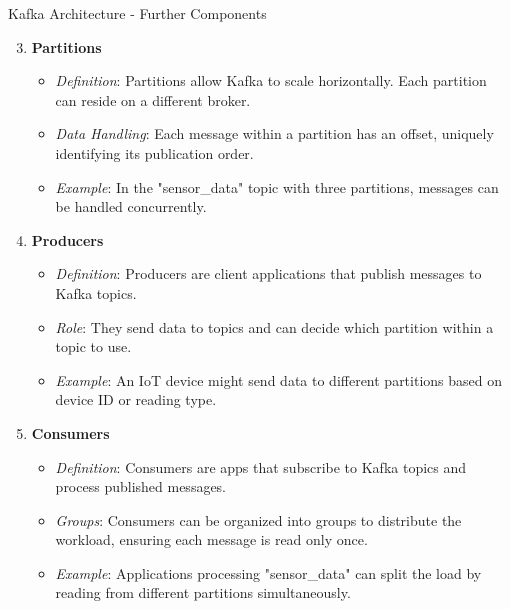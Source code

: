 \documentclass[aspectratio=169]{beamer}
\begin{document}
\begin{frame}[fragile]{Kafka Architecture - Further Components}
    \begin{enumerate}
        \setcounter{enumi}{2} %
        \item \textbf{Partitions}
        \begin{itemize}
            \item \textit{Definition}: Partitions allow Kafka to scale horizontally. Each partition can reside on a different broker.
            \item \textit{Data Handling}: Each message within a partition has an offset, uniquely identifying its publication order.
            \item \textit{Example}: In the "sensor_data" topic with three partitions, messages can be handled concurrently.

        \end{itemize}

        \item \textbf{Producers}
        \begin{itemize}
            \item \textit{Definition}: Producers are client applications that publish messages to Kafka topics.
            \item \textit{Role}: They send data to topics and can decide which partition within a topic to use.
            \item \textit{Example}: An IoT device might send data to different partitions based on device ID or reading type.
        \end{itemize}
        
        \item \textbf{Consumers}
        \begin{itemize}
            \item \textit{Definition}: Consumers are apps that subscribe to Kafka topics and process published messages.
            \item \textit{Groups}: Consumers can be organized into groups to distribute the workload, ensuring each message is read only once.
            \item \textit{Example}: Applications processing "sensor_data" can split the load by reading from different partitions simultaneously.
        \end{itemize}
    \end{enumerate}
\end{frame}
\end{document}

